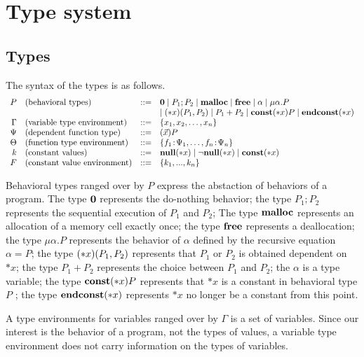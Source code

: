 \section{Type system}
\label{sec:typesystem}

\subsection{Types}
The syntax of the types is as follows.
\[
\begin{array}{rlcl}
  P & (\mbox{behavioral types})&::=& {\bf 0} \mid P_{1};P_{2}  \mid \mathbf{malloc} \mid \mathbf{free} \mid \alpha \mid \mu\alpha.P \\
  &  &  & \mid (*x)(P_1,P_2) \mid P_1 + P_2 \mid \mathbf{const}(*x) P  \mid \mathbf{endconst}(*x)\\
  \Gamma & (\mbox{variable type environment}) &::=& \{x_1, x_2, \dots, x_n\}\\
  \Psi & (\mbox{dependent function type}) &::=& (\vec{x})P\\
  \Theta & (\mbox{function type environment}) &::=& \{f_1\!:\! \Psi_1,\dots,f_n\!:\! \Psi_n\}\\
  k & (\mbox{constant values}) &::=& {\bf null}(*x) \mid \neg{\bf null}(*x) \mid \mathbf{const}(*x)   \\
  F & (\mbox{constant value environment}) &::=& \{k_1,...,k_n\} \\
\end{array}
\]

Behavioral types ranged over by \(P\) express the abstaction of
behaviors of a program. The type \({\bf 0}\) represents the do-nothing
behavior; the type \(P_1;P_2\) represents the sequential execution of
\(P_1\) and \(P_2\); The type \(\mathbf{malloc}\) represents an allocation of
a memory cell exactly once; the type \(\mathbf{free}\) represents a
deallocation; the type \(\mu \alpha.P\) represents the behavior of
\(\alpha\) defined by the recursive equation \(\alpha = P\); the type
\((*x)(P_1,P_2)\) represents that \(P_1\) or \(P_2\) is obtained
dependent on \(*x\); the type \(P_1 + P_2\) represents the choice
between \(P_1\) and \(P_2\); the \(\alpha\) is a type variable; the
type \(\mathbf{const}(*x) P\) represents that \(*x\) is a constant in behavioral
type \(P\) ; the type \(\mathbf{endconst}(*x)\) represents \(*x\) no longer be a
constant from this point.

A type environments for variables ranged over by \(\Gamma\) is a set
of variables.  Since our interest is the behavior of a program, not
the types of values, a variable type environment does not carry
information on the types of variables.

